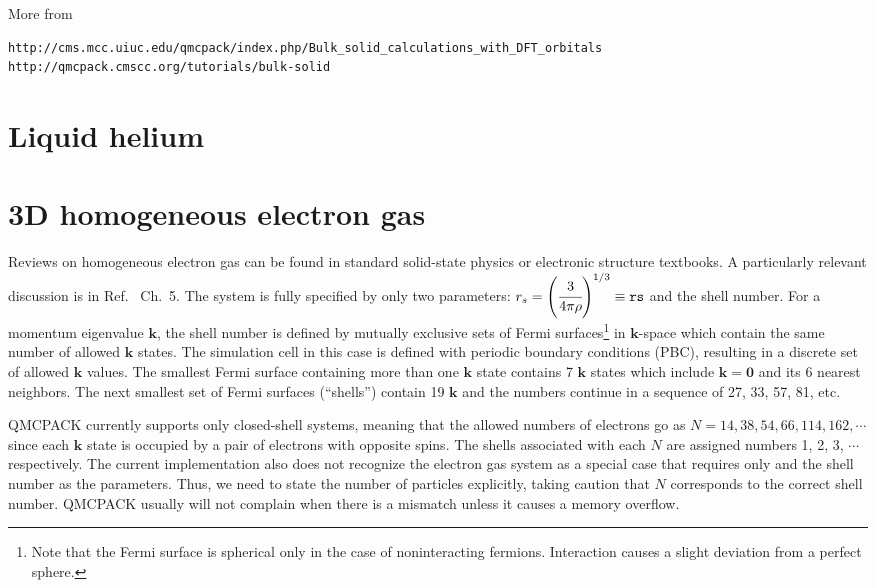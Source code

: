 More from 
\begin{verbatim}
http://cms.mcc.uiuc.edu/qmcpack/index.php/Bulk_solid_calculations_with_DFT_orbitals
http://qmcpack.cmscc.org/tutorials/bulk-solid
\end{verbatim}
\section{Liquid helium}
\section{3D homogeneous electron gas}
Reviews on homogeneous electron gas can be found in standard solid-state physics or electronic structure textbooks.  A particularly relevant discussion is in Ref.~ Ch.~5.  The system is fully specified by only two parameters: $r_s = \left( \cfrac{3}{4 \pi \rho} \right)^{1/3} \equiv \mathtt{rs}$ and the shell number.  For a momentum eigenvalue $\mathbf{k}$, the shell number is defined by mutually exclusive sets of Fermi surfaces\footnote{Note that the Fermi surface is spherical only in the case of noninteracting fermions.  Interaction causes a slight deviation from a perfect sphere.} in $\mathbf{k}$-space which contain the same number of allowed $\mathbf{k}$ states.  The simulation cell in this case is defined with periodic boundary conditions (PBC), resulting in a discrete set of allowed $\mathbf{k}$ values.  The smallest Fermi surface containing more than one $\mathbf{k}$ state contains 7 $\mathbf{k}$ states which include $\mathbf{k} = \mathbf{0}$ and its 6 nearest neighbors.  The next smallest set of Fermi surfaces (``shells'') contain 19 $\mathbf{k}$ and the numbers continue in a sequence of 27, 33, 57, 81, etc.

QMCPACK currently supports only closed-shell systems, meaning that the allowed numbers of electrons go as $N = 14, 38, 54, 66, 114, 162, \cdots$ since each $\mathbf{k}$ state is occupied by a pair of electrons with opposite spins.  The shells associated with each $N$ are assigned numbers 1, 2, 3, $\cdots$ respectively.  The current implementation also does not recognize the electron gas system as a special case that requires only  and the shell number as the parameters.  Thus, we need to state the number of particles explicitly, taking caution that $N$ corresponds to the correct shell number.  QMCPACK usually will not complain when there is a mismatch unless it causes a memory overflow.

